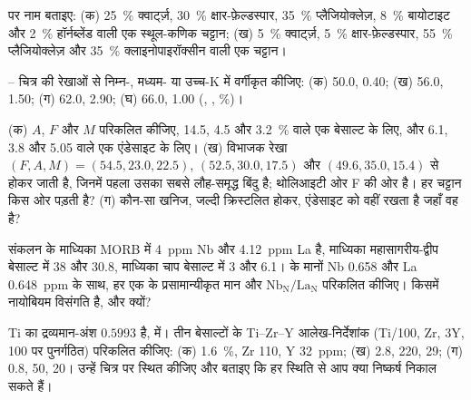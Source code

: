 \begin{exercise}[$\star$]\label{exo:b2:magmatic-series:3}
 पर नाम बताइए: (क) \qty{25}{\percent} क्वार्ट्ज़,
\qty{30}{\percent} क्षार-फ़ेल्डस्पार, \qty{35}{\percent} प्लैजियोक्लेज़, \qty{8}{\percent}
बायोटाइट और \qty{2}{\percent} हॉर्नब्लेंड वाली एक स्थूल-कणिक चट्टान; (ख) \qty{5}{\percent} क्वार्ट्ज़,
\qty{5}{\percent} क्षार-फ़ेल्डस्पार, \qty{55}{\percent} प्लैजियोक्लेज़ और
\qty{35}{\percent} क्लाइनोपाइरॉक्सीन वाली एक चट्टान।
\end{exercise}

\begin{exercise}[$\star$]\label{exo:b2:magmatic-series:4}
-- चित्र की रेखाओं से निम्न-, मध्यम- या उच्च-K में वर्गीकृत कीजिए:
(क) 50.0, 0.40; (ख) 56.0, 1.50; (ग) 62.0, 2.90; (घ) 66.0, 1.00 (,
, \unit{\percent})।
\end{exercise}

\begin{exercise}[$\star\star$]\label{exo:b2:magmatic-series:5}
(क) $A$, $F$ और $M$ परिकलित कीजिए,  14.5,  4.5 और
 \qty{3.2}{\percent} वाले एक बेसाल्ट के लिए, और 6.1, 3.8 और 5.05 वाले एक एंडेसाइट के लिए।
(ख) विभाजक रेखा $(F, A, M) = (54.5, 23.0, 22.5)$, $(52.5, 30.0,
17.5)$ और $(49.6, 35.0, 15.4)$ से होकर जाती है, जिनमें पहला उसका सबसे लौह-समृद्ध बिंदु है;
थोलिआइटी ओर F की ओर है। हर चट्टान किस ओर पड़ती है? (ग) कौन-सा
खनिज, जल्दी क्रिस्टलित होकर, एंडेसाइट को वहीं रखता है जहाँ वह है?
\end{exercise}

\begin{exercise}[$\star\star$]\label{exo:b2:magmatic-series:6}
संकलन के माध्यिका MORB में \qty{4}{ppm} Nb और \qty{4.12}{ppm} La है,
माध्यिका महासागरीय-द्वीप बेसाल्ट में 38 और 30.8, माध्यिका चाप बेसाल्ट में 3 और 6.1।  के मानों Nb 0.658 और La \qty{0.648}{ppm} के साथ, हर एक के प्रसामान्यीकृत मान
और $\mathrm{Nb_N}/\mathrm{La_N}$ परिकलित कीजिए। किसमें नायोबियम विसंगति है, और क्यों?
\end{exercise}

\begin{exercise}[$\star\star$]\label{exo:b2:magmatic-series:7}
Ti का द्रव्यमान-अंश $0.5993$ है,  में। तीन बेसाल्टों के Ti--Zr--Y आलेख-निर्देशांक
(Ti/100, Zr, $3\mathrm Y$, 100 पर पुनर्गठित) परिकलित कीजिए: (क) 
\qty{1.6}{\percent}, Zr 110, Y \qty{32}{ppm}; (ख) 2.8, 220, 29; (ग) 0.8, 50, 20। उन्हें
चित्र पर स्थित कीजिए और बताइए कि हर स्थिति से आप क्या निष्कर्ष निकाल सकते हैं।
\end{exercise}

